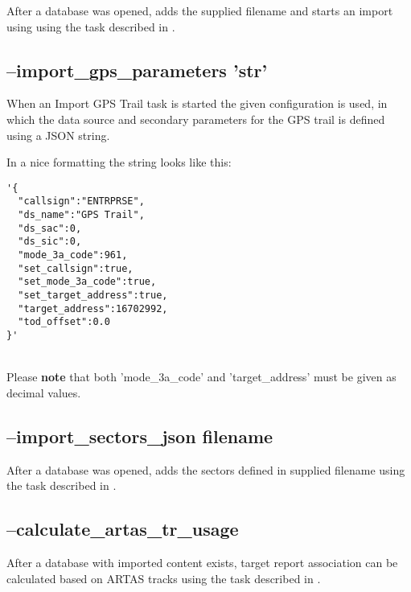 After a database was opened, adds the supplied filename and starts an import using using the task described in .

\subsection{--import\_gps\_parameters 'str'}

When an Import GPS Trail task is started the given configuration is used, in which the data source and secondary parameters for the GPS trail is defined using a JSON string.

In a nice formatting the string looks like this:
\begin{lstlisting}[basicstyle=\small\ttfamily]
'{
  "callsign":"ENTRPRSE",
  "ds_name":"GPS Trail",
  "ds_sac":0,
  "ds_sic":0,
  "mode_3a_code":961,
  "set_callsign":true,
  "set_mode_3a_code":true,
  "set_target_address":true,
  "target_address":16702992,
  "tod_offset":0.0
}'
\end{lstlisting}
\ \\

Please \textbf{note} that both 'mode\_3a\_code' and 'target\_address' must be given as decimal values.

% 
% 


\subsection{--import\_sectors\_json  filename}

After a database was opened, adds the sectors defined in supplied filename using the task described in .

\subsection{--calculate\_artas\_tr\_usage}

After a database with imported content exists, target report association can be calculated based on ARTAS tracks using the task described in .

